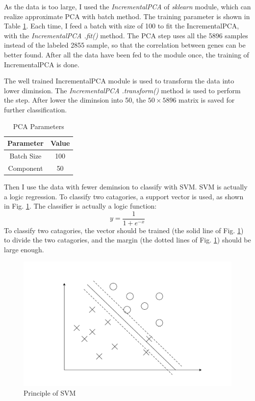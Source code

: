 \documentclass[sigchi]{acmart}
\begin{document}
As the data is too large, I used the \textit{IncrementalPCA} of \textit{sklearn} \cite{skit-learn.org} module, which can realize approximate PCA with batch method. The training parameter is shown in Table \ref{tab:PCAParameter}. Each time, I feed a batch with size of 100 to fit the IncrementalPCA, with the \textit{IncrementalPCA .fit()} method. The PCA step uses all the 5896 samples instead of the labeled 2855 sample, so that the correlation between genes can be better found. After all the data have been fed to the module once, the training of IncrementalPCA is done.

The well trained IncrementalPCA module is used to transform the data into lower diminsion. The \textit{IncrementalPCA .transform()} method is used to perform the step. After lower the diminsion into 50, the $50\times 5896$ matrix is saved for further classification. 

\begin{table}
  \caption{PCA Parameters}
  \label{tab:PCAParameter}
  \begin{tabular}{cc}
    \toprule
    Parameter & Value \\
    \midrule
    Batch Size & 100 \\
    Component & 50 \\
    \bottomrule
  \end{tabular}
\end{table}

Then I use the data with fewer deminsion to classify with SVM. SVM is actually a logic regression. To classify two catagories, a support vector is used, as shown in Fig. \ref{fig:SVM}. The classifier is actually a logic function:
\begin{equation}
  y=\dfrac{1}{1+e^{-x}}
\end{equation}
To classify two catagories, the vector should be trained (the solid line of Fig. \ref{fig:SVM}) to divide the two catagories, and the margin (the dotted lines of Fig. \ref{fig:SVM}) should be large enough.

\begin{figure}
  \centering
  \includegraphics[width=\linewidth]{figures/SVM.pdf}
  \caption{Principle of SVM}
  \label{fig:SVM}
\end{figure}
\end{document}
